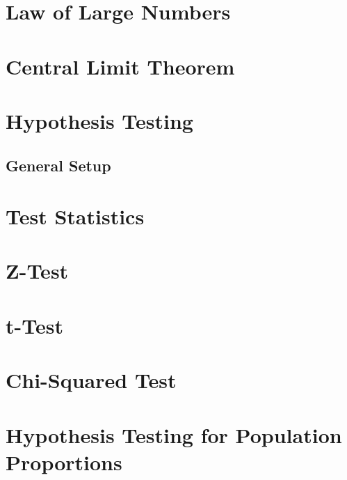 \documentclass[
]{book}
\begin{document}
\hypertarget{law-of-large-numbers}{%
\section{Law of Large Numbers}\label{law-of-large-numbers}}

\hypertarget{central-limit-theorem}{%
\section{Central Limit Theorem}\label{central-limit-theorem}}

\hypertarget{hypothesis-testing}{%
\section{Hypothesis Testing}\label{hypothesis-testing}}

\hypertarget{general-setup}{%
\subsection{General Setup}\label{general-setup}}

\hypertarget{test-statistics}{%
\section{Test Statistics}\label{test-statistics}}

\hypertarget{z-test}{%
\section{Z-Test}\label{z-test}}

\hypertarget{t-test}{%
\section{t-Test}\label{t-test}}

\hypertarget{chi-squared-test}{%
\section{Chi-Squared Test}\label{chi-squared-test}}

\hypertarget{hypothesis-testing-for-population-proportions}{%
\section{Hypothesis Testing for Population Proportions}\label{hypothesis-testing-for-population-proportions}}
\end{document}
